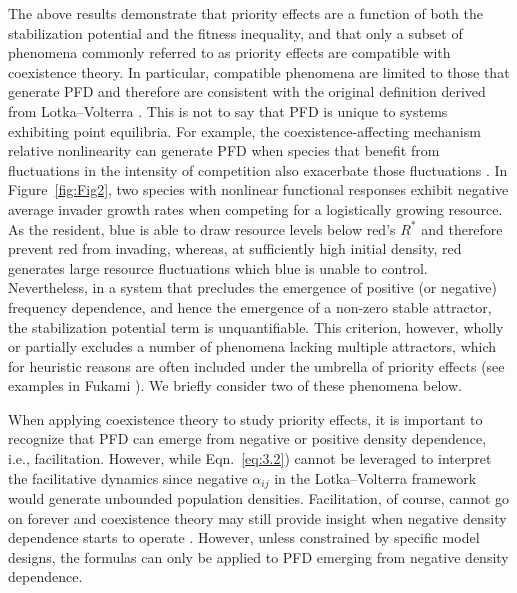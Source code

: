 The above results demonstrate that priority effects are a function of both the stabilization potential and the fitness inequality, and that only a subset of phenomena commonly referred to as priority effects are compatible with coexistence theory. In particular, compatible phenomena are limited to those that generate PFD and therefore are consistent with the original definition derived from Lotka--Volterra \citep{Petraitis2013}. This is not to say that PFD is unique to systems exhibiting point equilibria. For example, the coexistence-affecting mechanism relative nonlinearity can generate PFD when species that benefit from fluctuations in the intensity of competition also exacerbate those fluctuations \citep{Chesson2009}. In Figure~\ref{fig:Fig2}, two species with nonlinear functional responses exhibit negative average invader growth rates when competing for a logistically growing resource. As the resident, blue is able to draw resource levels below red's $R^*$ and therefore prevent red from invading, whereas, at sufficiently high initial density, red generates large resource fluctuations which blue is unable to control. Nevertheless, in a system that precludes the emergence of positive (or negative) frequency dependence, and hence the emergence of a non-zero stable attractor, the stabilization potential term is unquantifiable. This criterion, however, wholly or partially excludes a number of phenomena lacking multiple attractors, which for heuristic reasons are often included under the umbrella of priority effects (see examples in Fukami \cite{Fukami2015}). We briefly consider two of these phenomena below. 
\par


When applying coexistence theory to study priority effects, it is important to recognize that PFD can emerge from negative or positive density dependence, i.e., facilitation. However, while Eqn.~\ref{eq:3.2}) cannot be leveraged to interpret the facilitative dynamics since negative $\alpha_{ij}$ in the Lotka--Volterra framework would generate unbounded population densities. Facilitation, of course, cannot go on forever and coexistence theory may still provide insight when negative density dependence starts to operate \citep{Schreiber2017}. However, unless constrained by specific model designs, the formulas can only be applied to PFD emerging from negative density dependence. 
\par


